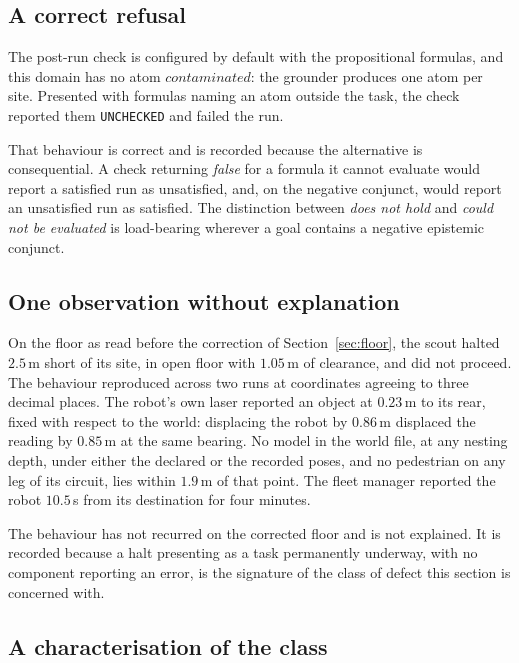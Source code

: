 \documentclass[11pt,a4paper]{article}
\theoremstyle{definition}
\newcommand{\code}[1]{\texttt{\small #1}}
\begin{document}
\subsection{A correct refusal}
\label{sec:refusal}

The post-run check is configured by default with the propositional formulas,
and this domain has no atom $\mathit{contaminated}$: the grounder produces one
atom per site. Presented with formulas naming an atom outside the task, the
check reported them \code{UNCHECKED} and failed the run.

That behaviour is correct and is recorded because the alternative is
consequential. A check returning \emph{false} for a formula it cannot evaluate
would report a satisfied run as unsatisfied, and, on the negative conjunct,
would report an unsatisfied run as satisfied. The distinction between
\emph{does not hold} and \emph{could not be evaluated} is load-bearing wherever
a goal contains a negative epistemic conjunct.

\subsection{One observation without explanation}

On the floor as read before the correction of Section~\ref{sec:floor}, the
scout halted $2.5$\,m short of its site, in open floor with $1.05$\,m of
clearance, and did not proceed. The behaviour reproduced across two runs at
coordinates agreeing to three decimal places. The robot's own laser reported an
object at $0.23$\,m to its rear, fixed with respect to the world: displacing
the robot by $0.86$\,m displaced the reading by $0.85$\,m at the same bearing.
No model in the world file, at any nesting depth, under either the declared or
the recorded poses, and no pedestrian on any leg of its circuit, lies within
$1.9$\,m of that point. The fleet manager reported the robot $10.5$\,s from its
destination for four minutes.

The behaviour has not recurred on the corrected floor and is not explained. It
is recorded because a halt presenting as a task permanently underway, with no
component reporting an error, is the signature of the class of defect this
section is concerned with.

\subsection{A characterisation of the class}
\label{sec:defectclass}
\end{document}
